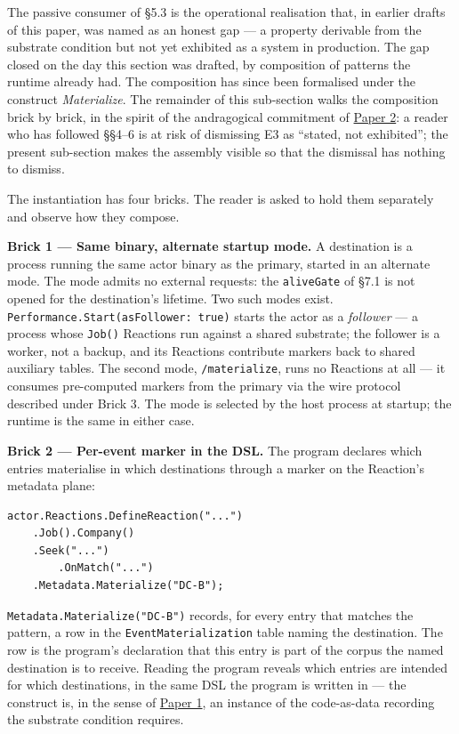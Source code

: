 \documentclass[
]{article}
\begin{document}
The passive consumer of §5.3 is the operational realisation that, in
earlier drafts of this paper, was named as an honest gap --- a property
derivable from the substrate condition but not yet exhibited as a system
in production. The gap closed on the day this section was drafted, by
composition of patterns the runtime already had. The composition has
since been formalised under the construct \emph{Materialize}. The
remainder of this sub-section walks the composition brick by brick, in
the spirit of the andragogical commitment of
\href{02-program-value-separability.md}{Paper 2}: a reader who has
followed §§4--6 is at risk of dismissing E3 as ``stated, not
exhibited''; the present sub-section makes the assembly visible so that
the dismissal has nothing to dismiss.

The instantiation has four bricks. The reader is asked to hold them
separately and observe how they compose.

\textbf{Brick 1 --- Same binary, alternate startup mode.} A destination
is a process running the same actor binary as the primary, started in an
alternate mode. The mode admits no external requests: the
\texttt{aliveGate} of §7.1 is not opened for the destination's lifetime.
Two such modes exist. \texttt{Performance.Start(asFollower:\ true)}
starts the actor as a \emph{follower} --- a process whose \texttt{Job()}
Reactions run against a shared substrate; the follower is a worker, not
a backup, and its Reactions contribute markers back to shared auxiliary
tables. The second mode, \texttt{/materialize}, runs no Reactions at all
--- it consumes pre-computed markers from the primary via the wire
protocol described under Brick 3. The mode is selected by the host
process at startup; the runtime is the same in either case.

\textbf{Brick 2 --- Per-event marker in the DSL.} The program declares
which entries materialise in which destinations through a marker on the
Reaction's metadata plane:

\begin{verbatim}
actor.Reactions.DefineReaction("...")
    .Job().Company()
    .Seek("...")
        .OnMatch("...")
    .Metadata.Materialize("DC-B");
\end{verbatim}

\texttt{Metadata.Materialize("DC-B")} records, for every entry that
matches the pattern, a row in the \texttt{EventMaterialization} table
naming the destination. The row is the program's declaration that this
entry is part of the corpus the named destination is to receive. Reading
the program reveals which entries are intended for which destinations,
in the same DSL the program is written in --- the construct is, in the
sense of \href{01-anti-porosity.md}{Paper 1}, an instance of the
code-as-data recording the substrate condition requires.
\end{document}
